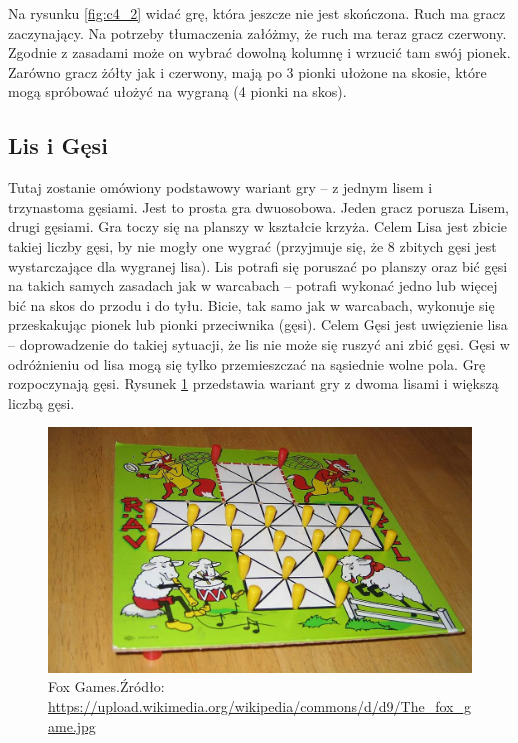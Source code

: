 \documentclass[polish,shortabstract,inz]{iithesis}
\begin{document}
Na rysunku \ref{fig:c4_2} widać grę, która jeszcze nie jest skończona.
Ruch ma gracz zaczynający. Na potrzeby tłumaczenia załóżmy, że ruch ma teraz gracz czerwony.
Zgodnie z zasadami może on wybrać dowolną kolumnę i wrzucić tam swój pionek.
Zarówno gracz żółty jak i czerwony, mają po 3 pionki ułożone na skosie, które mogą spróbować ułożyć na wygraną (4 pionki na skos).


\subsection{Lis i Gęsi}
Tutaj zostanie omówiony podstawowy wariant gry -- z jednym lisem i trzynastoma gęsiami.
Jest to prosta gra dwuosobowa. Jeden gracz porusza Lisem, drugi gęsiami.
Gra toczy się na planszy w kształcie krzyża.
Celem Lisa jest zbicie takiej liczby gęsi, by nie mogły one wygrać (przyjmuje się, że 8 zbitych gęsi jest wystarczające dla wygranej lisa).
Lis potrafi się poruszać po planszy oraz bić gęsi na takich samych zasadach jak w warcabach -- potrafi wykonać jedno lub więcej bić na skos do przodu i do tyłu. Bicie, tak samo jak w warcabach, wykonuje się przeskakując pionek lub pionki przeciwnika (gęsi).
Celem Gęsi jest uwięzienie lisa -- doprowadzenie do takiej sytuacji, że lis nie może się ruszyć ani zbić gęsi.
Gęsi w odróżnieniu od lisa mogą się tylko przemieszczać na sąsiednie wolne pola.
Grę rozpoczynają gęsi.
Rysunek \ref{fig:fg} przedstawia wariant gry z dwoma lisami i większą liczbą gęsi.
\begin{figure}[H]
  \includegraphics[scale=0.25]{./images/foxgames.jpg}
  \centering
  \caption{Fox Games.\newline Źródło:\,\url{https://upload.wikimedia.org/wikipedia/commons/d/d9/The\_fox\_game.jpg}}
  \label{fig:fg}
\end{figure}
\end{document}
